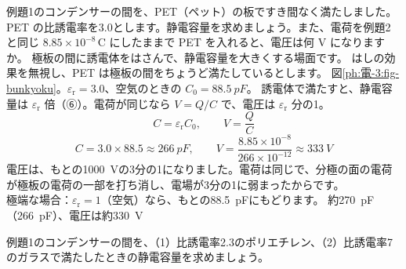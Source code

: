 \label{ph:電-3:ex4}
\begin{phreidai}[間にプラスチックをはさむ]
例題1のコンデンサーの間を、PET（ペット）の板ですき間なく満たしました。PET の比誘電率を3.0とします。静電容量を求めましょう。また、電荷を例題2と同じ $8.85\times10^{-8}$\,C にしたままで PET を入れると、電圧は何 V になりますか。
\phbamen
極板の間に誘電体をはさんで、静電容量を大きくする場面です。
\phmushi
はしの効果を無視し、PET は極板の間をちょうど満たしているとします。
\phzu
図\ref{ph:電-3:fig-bunkyoku}。$\varepsilon_{\mathrm r}=3.0$、空気のときの $C_0=\qty{88.5}{pF}$。
\phriyu
誘電体で満たすと、静電容量は $\varepsilon_{\mathrm r}$ 倍（⑥）。電荷が同じなら $V=Q/C$ で、電圧は $\varepsilon_{\mathrm r}$ 分の1。
\phtateru
\[C=\varepsilon_{\mathrm r}C_0,\qquad V=\frac{Q}{C}\]
\phtoku
\[C=3.0\times88.5\approx\qty{266}{pF},\qquad V=\frac{8.85\times10^{-8}}{266\times10^{-12}}\approx\qty{333}{V}\]
\phtashikame
電圧は、もとの\qty{1000}{V}の3分の1になりました。電荷は同じで、分極の面の電荷が極板の電荷の一部を打ち消し、電場が3分の1に弱まったからです。\\
極端な場合：$\varepsilon_{\mathrm r}=1$（空気）なら、もとの\qty{88.5}{pF}にもどります。
\kotae 約\qty{270}{pF}（\qty{266}{pF}）、電圧は約\qty{330}{V}
\end{phreidai}
\begin{jibun}
例題1のコンデンサーの間を、（1）比誘電率2.3のポリエチレン、（2）比誘電率7のガラスで満たしたときの静電容量を求めましょう。
\end{jibun}

